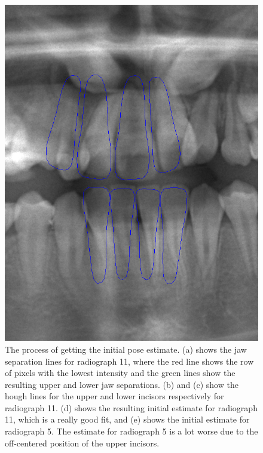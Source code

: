\documentclass[a4paper,titlepage,12pt]{article}
\begin{document}
\begin{figure}
\begin{minipage}[b]{0.32\linewidth}
	\end{minipage}
	\begin{minipage}[b]{0.32\linewidth}
		\includegraphics[width=\linewidth]{init/initial6.png}
	\end{minipage}
  \caption{
		The process of getting the initial pose estimate. (a) shows the jaw separation lines for radiograph 11, where the red line shows the row of pixels with the lowest intensity and the green lines show the resulting upper and lower jaw separations.
		(b) and (c) show the hough lines for the upper and lower incisors respectively for radiograph 11.
		(d) shows the resulting initial estimate for radiograph 11, which is a really good fit, and (e) shows the initial estimate for radiograph 5.
		The estimate for radiograph 5 is a lot worse due to the off-centered position of the upper incisors.} \label{init}
\end{figure}
\end{document}
